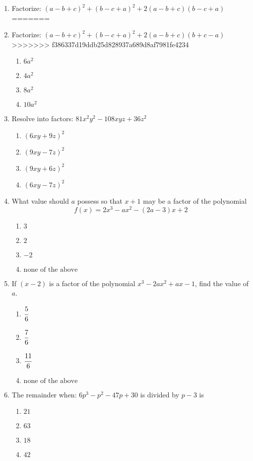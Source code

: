 \begin{multicols}{2}
\begin{enumerate}[label={\arabic*.}]
\item Factorize: $(a-b+c)^2 + (b-c+a)^2 + 2(a -b +c)(b-c+a)$
=======
\item Factorize: $(a-b+c)^2 + (b-c+a)^2 + 2(a -b +c)(b+c-a)$
>>>>>>> f386337d19ddb25d828937a689d8af7981fe4234
	\begin{enumerate}[label={\Alph*.}]
	\item \(6a^2\)
	\item \(4a^2\)
	\item \(8a^2\)
	\item \(10a^2\)
	\end{enumerate}
\item Resolve into factors: $81x^2y^2 - 108xyz + 36z^2$
	\begin{enumerate}[label={\Alph*.}]
	\item \((6xy + 9z)^2\)
	\item \((9xy - 7z)^2\)
	\item \((9xy + 6z)^2\)
	\item \((6xy - 7z)^2\)
	\end{enumerate}
\item What value should $a$ possess so that $x+1$ may be a factor of the polynomial \[f(x) = 2x^3 - ax^2 - (2a -3)x + 2\]
	\begin{enumerate}[label={\Alph*.}]
	\item \(3\)
	\item \(2\)
	\item \(-2\)
	\item \(\text{none of the above}\)
	\end{enumerate}
\item If $(x-2)$ is a factor of the polynomial $x^3 - 2ax^2 +ax -1$, find the value of \(a\).
	\begin{enumerate}[label={\Alph*.}]
	\item \(\cfrac{5}{6}\)
	\item \(\cfrac{7}{6}\)
	\item \(\cfrac{11}{6}\)
	\item \(\text{none of the above}\)
	\end{enumerate}
\item The remainder when: \(6p^3 - p^2 -47p + 30\) is divided by \(p-3\) is 	
\begin{enumerate}[label={\Alph*.}]
	\item \(21\)
	\item \(63\)
	\item \(18\)
	\item \(42\)
	\end{enumerate}

\end{enumerate}
\end{multicols}
